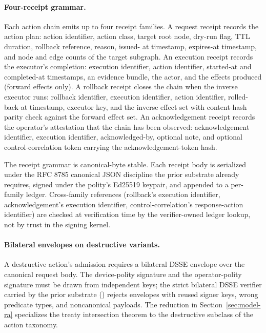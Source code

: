 \paragraph{Four-receipt grammar.}
Each action chain emits up to four receipt families. A request receipt
records the action plan: action identifier, action class, target root
node, dry-run flag, TTL duration, rollback reference, reason, issued-
at timestamp, expires-at timestamp, and node and edge counts of the
target subgraph. An execution receipt records the executor's
completion: execution identifier, action identifier, started-at and
completed-at timestamps, an evidence bundle, the actor, and the
effects produced (forward effects only). A rollback receipt closes the
chain when the inverse executor runs: rollback identifier, execution
identifier, action identifier, rolled-back-at timestamp, executor key,
and the inverse effect set with content-hash parity check against the
forward effect set. An acknowledgement receipt records the operator's
attestation that the chain has been observed: acknowledgement
identifier, execution identifier, acknowledged-by, optional note, and
optional control-correlation token carrying the acknowledgement-token
hash.

The receipt grammar is canonical-byte stable. Each receipt body is
serialized under the RFC 8785 canonical JSON discipline the prior
substrate \cite{programmableSovereigntyAnonymous} already requires,
signed under the polity's Ed25519 keypair, and appended to a per-family
ledger. Cross-family references
(rollback's execution identifier, acknowledgement's execution
identifier, control-correlation's response-action identifier) are
checked at verification time by the verifier-owned ledger lookup, not
by trust in the signing kernel.

\paragraph{Bilateral envelopes on destructive variants.}
A destructive action's admission requires a bilateral DSSE envelope
over the canonical request body. The device-polity signature and the
operator-polity signature must be drawn from independent keys; the
strict bilateral DSSE verifier carried by the prior substrate
\cite{programmableSovereigntyAnonymous}
() rejects
envelopes with reused signer keys, wrong predicate types, and
noncanonical payloads. The reduction 
in Section~\ref{sec:model-ra} specializes the treaty intersection
theorem to the destructive subclass of the action taxonomy.

